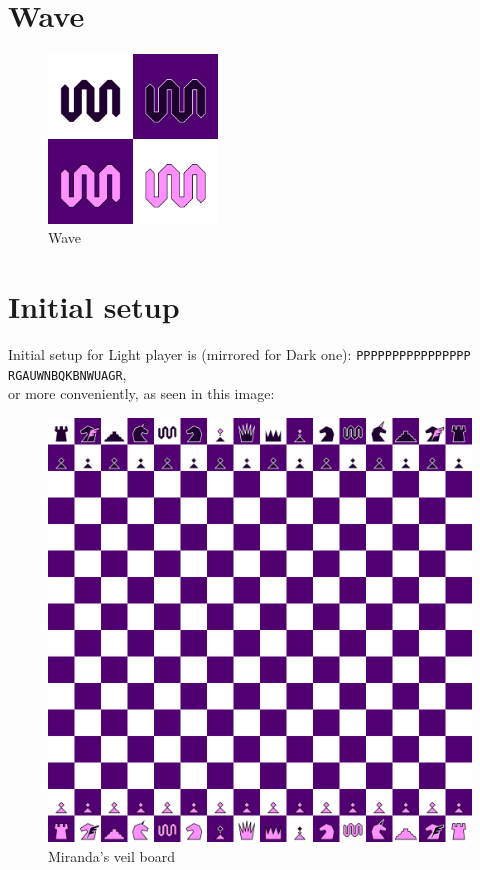 \documentclass[a5paper,12pt,draft]{book} %
\begin{document}
\clearpage

\section*{Wave}

\noindent
\begin{figure}
\includegraphics[width=0.4\textwidth, keepaspectratio=true]{../gfx/pieces/10_wave.png}
\caption{Wave}
\label{fig:wave}
\end{figure}

\clearpage

\section*{Initial setup}

Initial setup for Light player is (mirrored for Dark one):
\texttt{PPPPPPPPPPPPPPPP \\
        RGAUWNBQKBNWUAGR}, \\
or more conveniently, as seen in this image:

\noindent
\begin{figure}[h]
\includegraphics[width=1.0\textwidth, keepaspectratio=true]{../gfx/boards/10_miranda_s_veil.png}
\caption{Miranda's veil board}
\label{fig:miranda_s_veil}
\end{figure}
\end{document}
